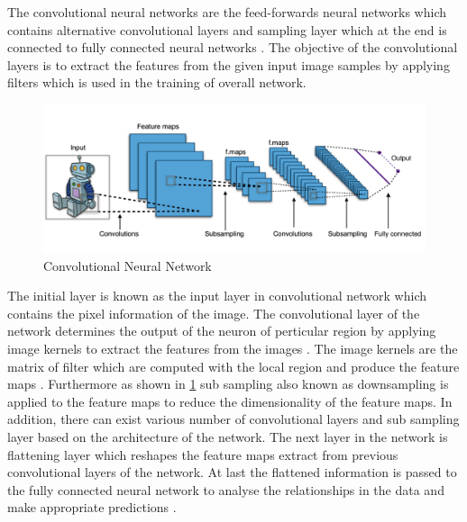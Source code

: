 The convolutional neural networks are the feed-forwards neural 
networks which contains alternative convolutional layers and sampling 
layer which at the end is connected to fully connected neural networks \citep{liew2016gender}.
The objective of the convolutional layers is to extract the features from 
the given input image samples by applying filters which is used in the training 
of overall network.

\begin{figure}[!htp]
    \includegraphics[width=\textwidth]{Images/cnn.png}
    \caption{Convolutional Neural Network}
    \label{figure:cnnf}
\end{figure}
The initial layer is known as the input layer in convolutional network 
which contains the pixel information of the image. The convolutional layer 
of the network determines the output of the neuron of perticular region 
by applying image kernels to extract the features from the images \citep{DBLP:journals/corr/OSheaN15}. 
The image kernels are the matrix of filter which are computed with the local region 
and produce the feature maps  \citep{DBLP:journals/corr/OSheaN15}. 
Furthermore as shown in \ref{figure:cnnf} sub sampling also 
known as downsampling is applied to the feature maps to reduce the dimensionality 
of the feature maps. In addition, there can exist various number of 
convolutional layers and sub sampling layer based on the architecture of the network.
The next layer in the network is flattening layer which reshapes the 
feature maps extract from previous convolutional layers of the network. 
At last the flattened information is passed to the fully connected neural network to analyse the relationships 
in the data and make appropriate predictions \citep{DBLP:journals/corr/OSheaN15}.  
\pagebreak